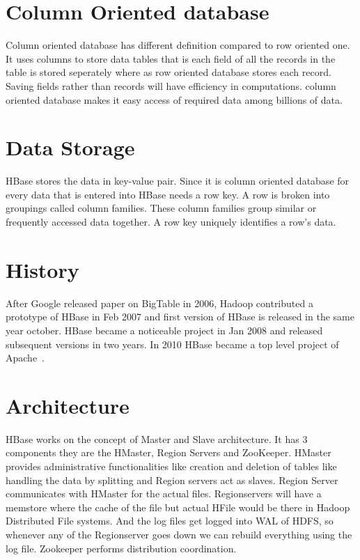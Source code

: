 \section{Column Oriented database}

Column oriented database has different definition compared to row oriented one. 
It uses columns to store data tables that is each field of all the records in 
the table is stored  seperately where as row oriented database stores each 
record. Saving fields rather than records will have efficiency in computations.
column oriented database makes it easy access of required data among billions of 
data. 

 \section{Data Storage}

 HBase stores the data in key-value pair. Since it is column oriented database 
 for every data that is entered into HBase needs a row key. A row is broken into
 groupings called column families. These column families group similar or 
 frequently accessed data together. A row key uniquely identifies a row's data.

\section{History}

 After Google released paper on BigTable in 2006, Hadoop contributed a prototype
of HBase in Feb 2007 and first version of HBase is released in the same year 
october. HBase became a noticeable project in Jan 2008 and released subsequent 
versions in two years. In 2010 HBase became a top level project of 
Apache~\cite{hid-sp18-421-HBase-history}.

\section{Architecture}

HBase works on the concept of Master and Slave architecture. It has 3
components they are the HMaster, Region Servers and ZooKeeper.   HMaster
provides administrative functionalities like creation and deletion of tables
like handling the data by splitting and Region servers act as slaves. Region
Server communicates with HMaster for the actual files. Regionservers will have a
memstore where the cache of the file but actual HFile  would be there in Hadoop
Distributed File systems. And the log files get logged  into WAL of HDFS, so
whenever any of the Regionserver goes down we can rebuild  everything using the
log file. Zookeeper performs distribution coordination.

